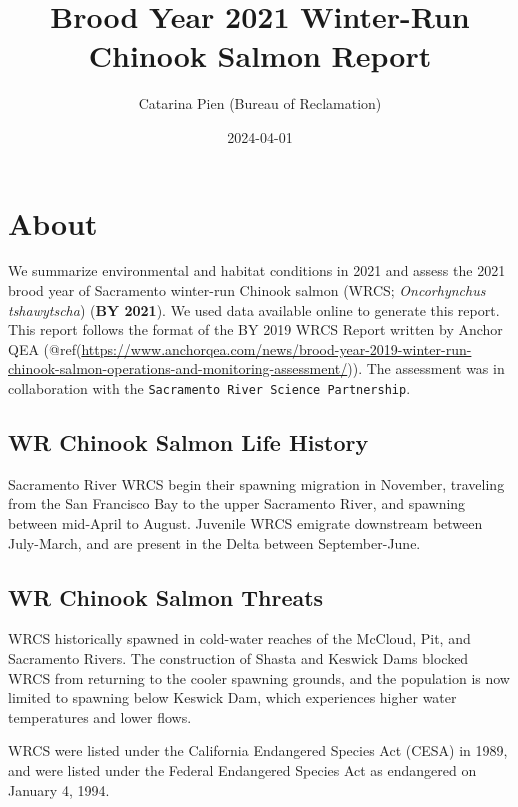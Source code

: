 \documentclass[
]{book}
\title{Brood Year 2021 Winter-Run Chinook Salmon Report}
\author{Catarina Pien (Bureau of Reclamation)}
\date{2024-04-01}
\theoremstyle{definition}
\theoremstyle{definition}
\theoremstyle{definition}
\theoremstyle{definition}
\theoremstyle{remark}
\begin{document}
\maketitle

{
\setcounter{tocdepth}{1}
\tableofcontents
}
\hypertarget{about}{%
\chapter{About}\label{about}}

We summarize environmental and habitat conditions in 2021 and assess the 2021 brood year of Sacramento winter-run Chinook salmon (WRCS; \emph{Oncorhynchus tshawytscha}) (\textbf{BY 2021}). We used data available online to generate this report. This report follows the format of the BY 2019 WRCS Report written by Anchor QEA (@ref(\url{https://www.anchorqea.com/news/brood-year-2019-winter-run-chinook-salmon-operations-and-monitoring-assessment/})). The assessment was in collaboration with the \texttt{Sacramento\ River\ Science\ Partnership}.

\hypertarget{wr-chinook-salmon-life-history}{%
\section{WR Chinook Salmon Life History}\label{wr-chinook-salmon-life-history}}

Sacramento River WRCS begin their spawning migration in November, traveling from the San Francisco Bay to the upper Sacramento River, and spawning between mid-April to August. Juvenile WRCS emigrate downstream between July-March, and are present in the Delta between September-June.

\hypertarget{wr-chinook-salmon-threats}{%
\section{WR Chinook Salmon Threats}\label{wr-chinook-salmon-threats}}

WRCS historically spawned in cold-water reaches of the McCloud, Pit, and Sacramento Rivers. The construction of Shasta and Keswick Dams blocked WRCS from returning to the cooler spawning grounds, and the population is now limited to spawning below Keswick Dam, which experiences higher water temperatures and lower flows.

WRCS were listed under the California Endangered Species Act (CESA) in 1989, and were listed under the Federal Endangered Species Act as endangered on January 4, 1994.
\end{document}
